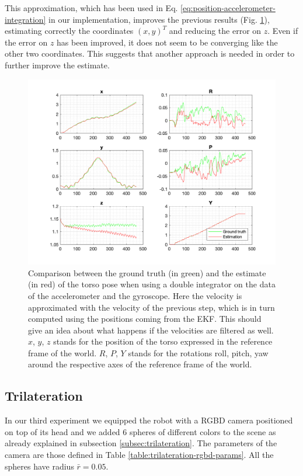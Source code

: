 \documentclass[a4paper]{article}
\begin{document}
This approximation, which has been used in Eq.
\ref{eq:position-accelerometer-integration} in our implementation,
improves the previous results
(Fig. \ref{fig:comp_ground_truth_estimated_torso_accelerometer_prevlinearvelocity}),
estimating correctly the coordinates $(x, y)^T$
and reducing the error on $z$. Even if the error on $z$ has been improved, it
does not seem to be converging like the other two coordinates.
This suggests that another approach is needed
in order to further improve the estimate.
\begin{figure}
    \centering
    \includegraphics[width=\textwidth]{images/accelerometer_prev_linearvelocity.png}
    \caption{Comparison between the ground truth (in green) and the estimate (in red) of the torso
        pose when using a double integrator on the data of the accelerometer
        and the gyroscope. Here the velocity is approximated with the velocity
        of the previous step, which is in turn computed using the positions
        coming from the EKF. This should give an idea about what happens if the
        velocities are filtered as well. $x$, $y$, $z$ stands for the position
        of the torso expressed in the reference frame of the
        world. $R$, $P$, $Y$ stands for the rotations roll,
        pitch, yaw around the respective axes of the
        reference frame of the world.}
    \label{fig:comp_ground_truth_estimated_torso_accelerometer_prevlinearvelocity}
\end{figure}

\subsection{Trilateration}
In our third experiment we equipped the robot with a RGBD camera positioned
on top of its head and we added 6 spheres of different colors to the scene as
already explained in subsection \ref{subsec:trilateration}. The parameters of
the camera are those defined in Table \ref{table:trilateration-rgbd-params}.
All the spheres
have radius $\bar{r}=0.05$.
\end{document}
